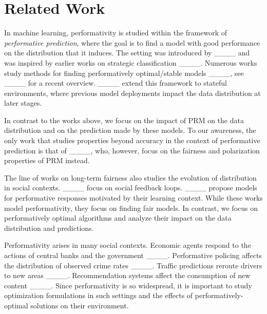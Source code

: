\section{Related Work}
 In machine learning, performativity is studied within the framework of
\emph{performative prediction}, where the goal is to find a model with good
performance on the distribution that it induces. The setting was introduced by
____ and was inspired by earlier works on strategic classification
____. Numerous works study methods for finding performatively
optimal/stable models ____, see ____ for a recent overview.
____ extend this framework to stateful
environments, where previous model deployments impact the data distribution at
later stages.

In contrast to the works above, we focus on the impact of PRM on the data distribution and on the prediction made by these models. To our awareness, the only work that studies properties beyond accuracy in the context of performative prediction is that of ____, who, however, focus on the
fairness and polarization properties of PRM instead.

 The line of works on long-term fairness also studies the evolution of
distribution in social contexts. ____
focus on social feedback loops. ____
propose models for performative responses motivated by their learning context.
While these works model performativity, they focus on finding fair models. In
contrast, we focus on performatively optimal algorithms and analyze their
impact on the data distribution and predictions. 

 Performativity arises in many social contexts. Economic agents respond to the
actions of central banks and the government ____. Performative policing
affects the distribution of observed crime rates ____. Traffic
predictions reroute drivers to new areas ____. Recommendation
systems affect the consumption of new content ____. Since performativity is so widespread, it is important to study optimization formulations in such settings and the effects of performatively-optimal solutions on their environment.